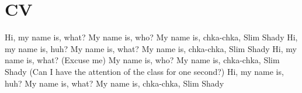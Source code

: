\chapter*{CV}

Hi, my name is, what? My name is, who?
My name is, chka-chka, Slim Shady
Hi, my name is, huh? My name is, what?
My name is, chka-chka, Slim Shady
Hi, my name is, what? (Excuse me) My name is, who?
My name is, chka-chka, Slim Shady
(Can I have the attention of the class for one second?)
Hi, my name is, huh? My name is, what?
My name is, chka-chka, Slim Shady



\clearpage